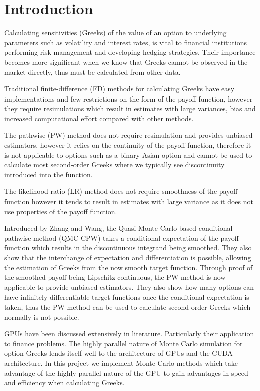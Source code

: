 \chapter{Introduction}

Calculating sensitivities (Greeks) of the value of an option to underlying parameters such as volatility and interest rates, is vital to financial institutions performing risk management and developing hedging strategies. Their importance becomes more significant when we know that Greeks cannot be observed in the market directly, thus must be calculated from other data.

Traditional finite-difference (FD) methods for calculating Greeks have easy implementations and few restrictions on the form of the payoff function, however they require resimulations which result in estimates with large variances, bias and increased computational effort compared with other methods. 

The pathwise (PW) \cite{glasserman1991gradient} method does not require resimulation and provides unbiased estimators, however it relies on the continuity of the payoff function, therefore it is not applicable to options such as a binary Asian option and cannot be used to calculate most second-order Greeks where we typically see discontinuity introduced into the function.

The likelihood ratio (LR) method does not require smoothness of the payoff function however it tends to result in estimates with large variance as it does not use properties of the payoff function.

Introduced by Zhang and Wang, the Quasi-Monte Carlo-based conditional pathwise method (QMC-CPW) \cite{ZhangConditionalQuasiMonteCarloMethod} takes a conditional expectation of the payoff function which results in the discontinuous integrand being smoothed. They also show that the interchange of expectation and differentiation is possible, allowing the estimation of Greeks from the now smooth target function. Through proof of the smoothed payoff being Lipschitz continuous, the PW method is now applicable to provide unbiased estimators. They also show how many options can have infinitely differentiable target functions once the conditional expectation is taken, thus the PW method can be used to calculate second-order Greeks which normally is not possible.

GPUs have been discussed extensively in literature. Particularly their application to finance problems. The highly parallel nature of Monte Carlo simulation for option Greeks lends itself well to the architecture of GPUs and the CUDA architecture. In this project we implement Monte Carlo methods which take advantage of the highly parallel nature of the GPU to gain advantages in speed and efficiency when calculating Greeks.

